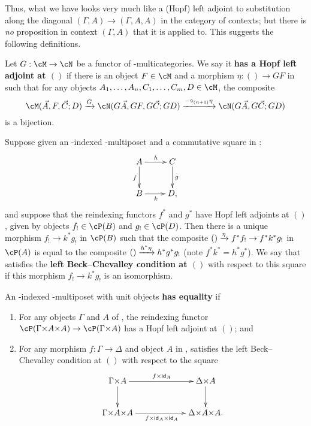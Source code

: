Thus, what we have looks very much like a (Hopf) left adjoint to substitution along the diagonal $(\Gamma,A) \to (\Gamma,A,A)$ in the category of contexts; but there is \emph{no} proposition in context $(\Gamma,A)$ that it is applied to.
This suggests the following definitions.

\begin{defn}\label{defn:multicat-hopf-ladj-empty}
  Let $G:\cM\to\cN$ be a functor of \fS-multicategories.
  We say it \textbf{has a Hopf left adjoint at $()$} if there is an object $F\in\cM$ and a morphism $\eta:()\to GF$ in \cN such that for any objects $A_1,\dots,A_n,C_1,\dots,C_m,D\in \cM$, the composite
  \[ \cM(\vec A,F,\vec C;D) \xto{G} \cN(G\vec A, GF, G\vec C; GD) \xto{-\circ_{(n+1)} \eta} \cN(G\vec A, G\vec C; GD) \]
  is a bijection.
\end{defn}

\begin{defn}
  Suppose given an \cS-indexed \fS-multiposet \cP and a commutative square in \cS:
  \[ \xymatrix{ A \ar[r]^h \ar[d]_f & C \ar[d]^g \\ B \ar[r]_k & D, } \]
  and suppose that the reindexing functors $f^*$ and $g^*$ have Hopf left adjoints at $()$, given by objects $f_!\in \cP(B)$ and $g_!\in \cP(D)$.
  Then there is a unique morphism $f_! \to k^* g_!$ in $\cP(B)$ such that the composite $() \xrightarrow{\eta} f^* f_! \to f^* k^* g_!$ in $\cP(A)$ is equal to the composite $() \xrightarrow{h^* \eta} h^* g^* g_!$ (note $f^* k^* = h^* g^*$).
  We say that \cP satisfies the \textbf{left Beck--Chevalley condition at $()$} with respect to this square if this morphism $f_! \to k^* g_!$ is an isomorphism.
\end{defn}

\begin{defn}
  An \cS-indexed \fS-multiposet with unit objects \textbf{has equality} if
  \begin{enumerate}
  \item For any objects $\Gamma$ and $A$ of \cS, the reindexing functor $\cP(\Gamma\times A\times A) \to \cP(\Gamma\times A)$ has a Hopf left adjoint at $()$; and
  \item For any morphism $f:\Gamma\to\Delta$ and object $A$ in \cS, \cP satisfies the left Beck--Chevalley condition at $()$ with respect to the square
    \[ \xymatrix@C=5pc{ \Gamma\times A \ar[r]^{f\times \idfunc_A} \ar[d] & \Delta\times A \ar[d] \\
      \Gamma\times A\times A \ar[r]_{f\times \idfunc_A \times \idfunc_A} & \Delta\times A\times A. } \]
  \end{enumerate}
\end{defn}

